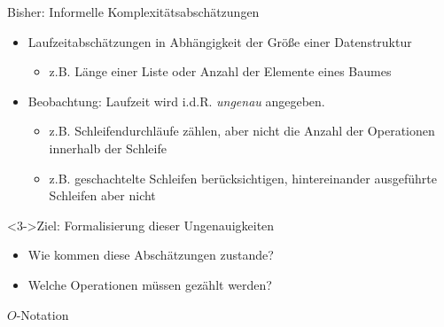 \begin{frame}
    \begin{block}{Bisher: Informelle Komplexitätsabschätzungen}
        \begin{itemize}
            \item Laufzeitabschätzungen in Abhängigkeit der Größe einer Datenstruktur
            \begin{itemize}
                \item z.B. Länge einer Liste oder Anzahl der Elemente eines Baumes
            \end{itemize}
            \item<2-> Beobachtung: Laufzeit wird i.d.R. \emph{ungenau} angegeben.
            \begin{itemize}
                \item z.B. Schleifendurchläufe zählen, aber nicht die Anzahl der Operationen innerhalb der Schleife
                \item z.B. geschachtelte Schleifen berücksichtigen, hintereinander ausgeführte Schleifen aber nicht
            \end{itemize}
        \end{itemize}
    \end{block}

    \begin{block}<3->{Ziel: Formalisierung dieser Ungenauigkeiten}
        \begin{itemize}
            \item Wie kommen diese Abschätzungen zustande?
            \item Welche Operationen müssen gezählt werden?
        \end{itemize}
    \end{block}
\end{frame}

\begin{frame}
\end{frame}
    
\begin{frame}
    \begin{defblock}{$O$-Notation}
    \end{defblock}
\end{frame}
